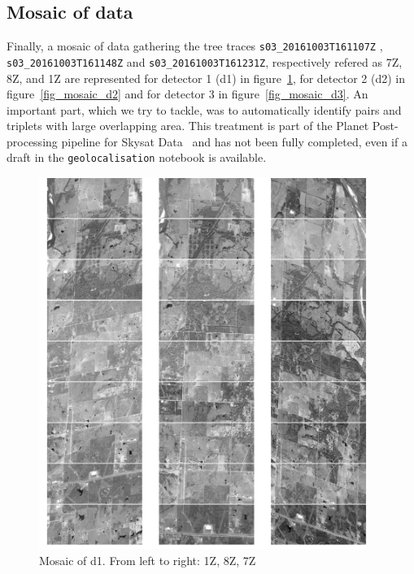 \documentclass[paper=a4, fontsize=11pt, onecolumn, tikz, dvipsnames, svgnames, x11names]{article}
\begin{document}
 \newpage
\subsection{Mosaic of data}

Finally, a mosaic of data gathering the tree traces  \verb$s03_20161003T161107Z$ , \verb$s03_20161003T161148Z$ and \verb$s03_20161003T161231Z$, respectively refered as 7Z, 8Z, and 1Z are represented for detector 1 (d1) in figure~\ref{fig_mosaic_d1}, for detector 2 (d2) in figure~\ref{fig_mosaic_d2} and for detector 3 in figure~\ref{fig_mosaic_d3}. An important part, which we try to tackle, was to automatically identify pairs and triplets with large overlapping area. This treatment is part of the Planet Post-processing pipeline for Skysat Data~\cite{planet_product} and has not been fully completed, even if a draft in the \verb$geolocalisation$ notebook is available.

 \begin{figure}[H]
     \centering
     \includegraphics[width = 0.95\textwidth]{d1.png}
     \caption{Mosaic of d1. From left to right: 1Z, 8Z, 7Z}
     \label{fig_mosaic_d1}
 \end{figure}
\end{document}
